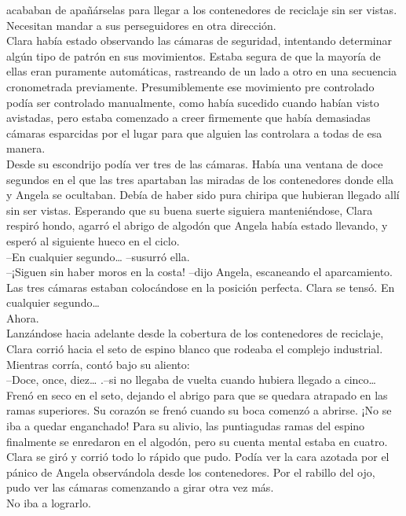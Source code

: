 acababan de apañárselas para llegar a los contenedores de reciclaje sin
ser vistas. Necesitan mandar a sus perseguidores en otra dirección.\\
Clara había estado observando las cámaras de seguridad, intentando
determinar algún tipo de patrón en sus movimientos. Estaba segura de que
la mayoría de ellas eran puramente automáticas, rastreando de un lado a
otro en una secuencia cronometrada previamente. Presumiblemente ese
movimiento pre controlado podía ser controlado manualmente, como había
sucedido cuando habían visto avistadas, pero estaba comenzado a creer
firmemente que había demasiadas cámaras esparcidas por el lugar para que
alguien las controlara a todas de esa manera.\\
Desde su escondrijo podía ver tres de las cámaras. Había una ventana de
doce segundos en el que las tres apartaban las miradas de los
contenedores donde ella y Angela se ocultaban. Debía de haber sido pura
chiripa que hubieran llegado allí sin ser vistas. Esperando que su buena
suerte siguiera manteniéndose, Clara respiró hondo, agarró el abrigo de
algodón que Angela había estado llevando, y esperó al siguiente hueco en
el ciclo.\\
--En cualquier segundo\ldots{} --susurró ella.\\
--¡Siguen sin haber moros en la costa! --dijo Angela, escaneando el
aparcamiento.\\
Las tres cámaras estaban colocándose en la posición perfecta. Clara se
tensó. En cualquier segundo\ldots{}\\
Ahora.\\
Lanzándose hacia adelante desde la cobertura de los contenedores de
reciclaje, Clara corrió hacia el seto de espino blanco que rodeaba el
complejo industrial. Mientras corría, contó bajo su aliento:\\
--Doce, once, diez\ldots{} .--si no llegaba de vuelta cuando hubiera
llegado a cinco\ldots{}\\
Frenó en seco en el seto, dejando el abrigo para que se quedara atrapado
en las ramas superiores. Su corazón se frenó cuando su boca comenzó a
abrirse. ¡No se iba a quedar enganchado! Para su alivio, las puntiagudas
ramas del espino finalmente se enredaron en el algodón, pero su cuenta
mental estaba en cuatro.\\
Clara se giró y corrió todo lo rápido que pudo. Podía ver la cara
azotada por el pánico de Angela observándola desde los contenedores. Por
el rabillo del ojo, pudo ver las cámaras comenzando a girar otra vez
más.\\
No iba a lograrlo.\\
